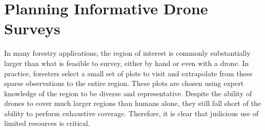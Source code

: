 




\section{Planning Informative Drone Surveys}

In many forestry applications, the region of interest is commonly substantially larger than what is feasible to survey, either by hand or even with a drone. In practice, foresters  select a small set of plots to visit and extrapolate from these sparse observations to the entire region. These plots are chosen using expert knowledge of the region to be diverse and representative. Despite the ability of drones to cover much larger regions than humans alone, they still fall short of the ability to perform  exhaustive coverage. Therefore, it is clear that judicious use of limited resources is critical.


